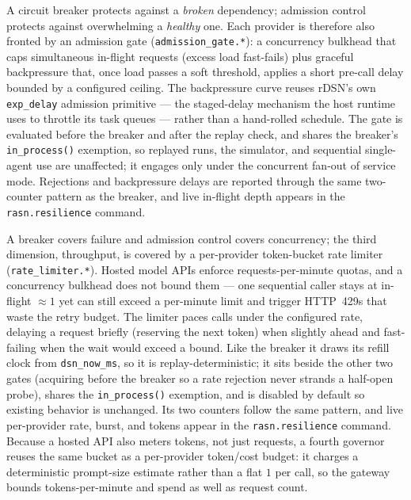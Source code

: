 \documentclass[manuscript,screen,review]{acmart}
\newcommand{\rdsn}{rDSN\xspace}
\begin{document}
A circuit breaker protects against a \emph{broken} dependency; admission control
protects against overwhelming a \emph{healthy} one. Each provider is therefore also
fronted by an admission gate (\texttt{admission\_gate.*}): a concurrency bulkhead
that caps simultaneous in-flight requests (excess load fast-fails) plus graceful
backpressure that, once load passes a soft threshold, applies a short pre-call delay
bounded by a configured ceiling. The backpressure curve reuses \rdsn's own
\texttt{exp\_delay} admission primitive --- the staged-delay mechanism the host
runtime uses to throttle its task queues --- rather than a hand-rolled schedule. The
gate is evaluated before the breaker and after the replay check, and shares the
breaker's \texttt{in\_process()} exemption, so replayed runs, the simulator, and
sequential single-agent use are unaffected; it engages only under the concurrent
fan-out of service mode. Rejections and backpressure delays are reported through the
same two-counter pattern as the breaker, and live in-flight depth appears in the
\texttt{rasn.resilience} command.

A breaker covers failure and admission control covers concurrency; the third
dimension, throughput, is covered by a per-provider token-bucket rate limiter
(\texttt{rate\_limiter.*}). Hosted model APIs enforce requests-per-minute quotas,
and a concurrency bulkhead does not bound them --- one sequential caller stays at
in-flight $\approx 1$ yet can still exceed a per-minute limit and trigger HTTP~429s
that waste the retry budget. The limiter paces calls under the configured rate,
delaying a request briefly (reserving the next token) when slightly ahead and
fast-failing when the wait would exceed a bound. Like the breaker it draws its
refill clock from \texttt{dsn\_now\_ms}, so it is replay-deterministic; it sits
beside the other two gates (acquiring before the breaker so a rate rejection never
strands a half-open probe), shares the \texttt{in\_process()} exemption, and is
disabled by default so existing behavior is unchanged. Its two counters follow the
same pattern, and live per-provider rate, burst, and tokens appear in the
\texttt{rasn.resilience} command. Because a hosted API also meters tokens, not just
requests, a fourth governor reuses the same bucket as a per-provider token/cost
budget: it charges a deterministic prompt-size estimate rather than a flat $1$ per
call, so the gateway bounds tokens-per-minute and spend as well as request count.
\end{document}
